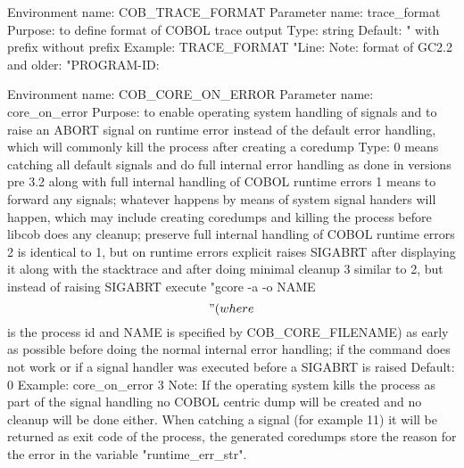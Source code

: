 Environment name:  COB_TRACE_FORMAT
  Parameter name:  trace_format
         Purpose:  to define format of COBOL trace output
            Type:  string
         Default:  "%
                      with prefix
                      without prefix
         Example:  TRACE_FORMAT  "Line: %
            Note:  format of GC2.2 and older:
                   "PROGRAM-ID: %

Environment name:  COB_CORE_ON_ERROR
  Parameter name:  core_on_error
         Purpose:  to enable operating system handling of signals and to
                   raise an ABORT signal on runtime error instead of the
                   default error handling, which will commonly kill the
                   process after creating a coredump
            Type:  0   means catching all default signals and do full
                       internal error handling as done in versions pre 3.2
                       along with full internal handling of COBOL runtime
                       errors
                   1   means to forward any signals; whatever happens
                       by means of system signal handers will happen,
                       which may include creating coredumps and killing
                       the process before libcob does any cleanup; preserve
                       full internal handling of COBOL runtime errors
                   2   is identical to 1, but on runtime errors explicit
                       raises SIGABRT after displaying it along with the  
                       stacktrace and after doing minimal cleanup
                   3   similar to 2, but instead of raising SIGABRT execute
                       "gcore -a -o NAME $$" (where $$ is the process id and
                       NAME is specified by COB_CORE_FILENAME) as early as
                       possible before doing the normal internal error
                       handling; if the command does not work or if a signal
                       handler was executed before a SIGABRT is raised
         Default:  0
         Example:  core_on_error 3
            Note:  If the operating system kills the process as part of the
                   signal handling no COBOL centric dump will be created and
                   no cleanup will be done either.
                   When catching a signal (for example 11) it will be
                   returned as exit code of the process, the generated
                   coredumps store the reason for the error in the variable
                   "runtime_err_str".

